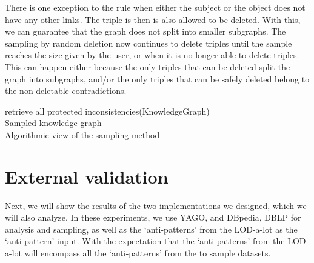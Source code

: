 \documentclass[11pt,letterpaper ,oneside ]{book}
\begin{document}
	There is one exception to the rule when either the subject or the object does not have any other links. The triple is then is also allowed to be deleted. With this, we can guarantee that the graph does not split into smaller subgraphs. 
	The sampling by random deletion now continues to delete triples until the sample reaches the size given by the user, or when it is no longer able to delete triples. This can happen either because the only triples that can be deleted split the graph into subgraphs, and/or the only triples that can be safely deleted belong to the non-deletable contradictions.
	
	\begin{algorithm}
		retrieve all protected inconsistencies(KnowledgeGraph) \\
		\Return Sampled knowledge graph\\
		\caption{Algorithmic view of the sampling method}
		\label{High top view}
	\end{algorithm}
	
	\newpage
	\chapter{External validation}\label{externalvalidation}
	Next, we will show the results of the two implementations we designed, which we will also analyze. In these experiments, we use YAGO, and DBpedia, DBLP for analysis and sampling, as well as the `anti-patterns' from the LOD-a-lot as the `anti-pattern' input. With the expectation that the `anti-patterns' from the LOD-a-lot will encompass all the `anti-patterns' from the to sample datasets.\\
	\begin{table}[!b]
		\centering
		\caption{table showing several statistics about graphs.}
		\label{table:GraphStats}
	\end{table}
\end{document}
